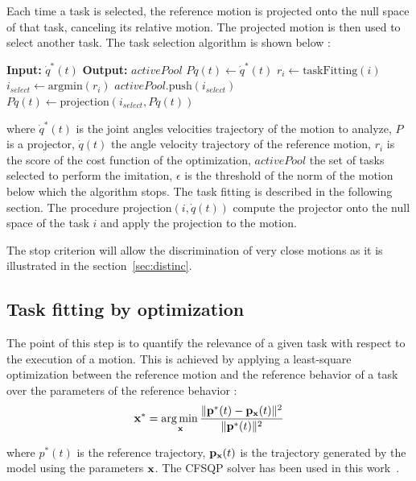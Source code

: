 \documentclass[letterpaper, 10pt, conference]{ieeeconf}      %
\begin{document}
Each time a task is selected, the reference motion is projected
onto the null space of that task, canceling its relative motion. 
The projected motion is then used to select another task.
The task selection algorithm is shown below :

\newcommand{\shOUTPUT}{\textbf{Output: }}
\newcommand{\shINPUT}{\textbf{Input: }}

\begin{algorithmic}
\STATE \shINPUT $\dot{q}^{*}(t)$
\STATE \shOUTPUT $activePool$
\STATE $P\dot{q}(t)\gets \dot{q}^{*}(t)$
    \STATE $r_i \gets \mathrm{taskFitting}(i)$
  \ENDFOR
  \STATE $i_{select} \gets \mathrm{argmin}(r_i)$
  \STATE $activePool.\mathrm{push}(i_{select})$
  \STATE $P\dot{q}(t) \gets \mathrm{projection}(i_{select}, P\dot{q}(t))$
\ENDWHILE
\end{algorithmic}
where  $\dot{q}^{*}(t)$ is the joint angles velocities trajectory of the motion to analyze,
$P$ is a projector, $\dot{q}(t)$ the angle velocity trajectory
of the reference motion, $r_i$ is the score of the cost function of the optimization, $activePool$
the set of tasks selected to perform the imitation, $\epsilon$ is the threshold
of the norm of the motion below which the algorithm stops. The task fitting is described
in the following section. The procedure $\mathrm{projection}(i, \dot{q}(t))$ compute the projector onto
the null space of the task $i$ and apply the projection to the motion.

The stop criterion will allow the discrimination of very close motions as it is illustrated in
the section~\ref{sec:distinc}.

\subsection{Task fitting by optimization} \label{sec:alg2:proj}
The point of this step is to quantify the relevance of a given task with respect to
the execution of a motion. This is achieved by applying a least-square optimization
between the reference motion and the reference behavior of a task over the parameters
of the reference behavior :
\begin{equation}
	{\mathbf{x}}^* = \underset{{\mathbf{x}}}{\operatorname*{arg\,min\,}} \frac{\Vert {\mathbf{p}}^*(t) - {\mathbf{p}}_{\mathbf{x}}(t) \Vert^2}{\Vert {\mathbf{p}}^*(t) \Vert^2}
\label{optimProblem}
\end{equation}

\noindent where $p^*(t)$ is the reference trajectory, ${\mathbf{p}}_{\mathbf{x}}(t)$ is the trajectory
generated by the model using the parameters ${\mathbf{x}}$. The CFSQP solver has been used in this work~\cite{lawrence97}.
\end{document}
